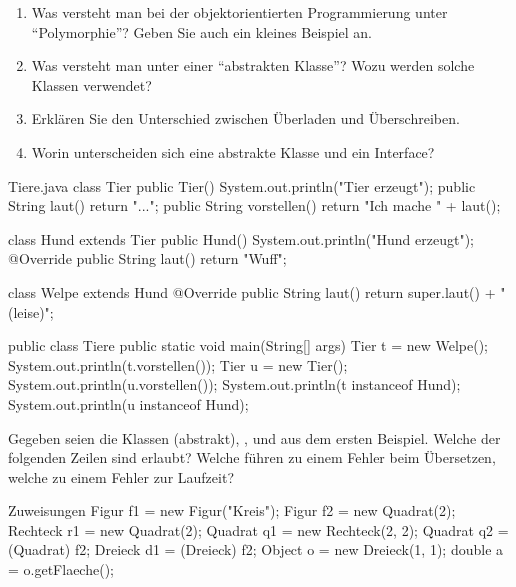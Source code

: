 \aufgaben
{}
\begin{enumerate}[label=\alph*)]
\item Was versteht man bei der objektorientierten Programmierung unter \enquote{Polymorphie}? Geben Sie auch ein kleines Beispiel an.
\item Was versteht man unter einer \enquote{abstrakten Klasse}? Wozu werden solche Klassen verwendet?
\item Erklären Sie den Unterschied zwischen Überladen und Überschreiben.
\item Worin unterscheiden sich eine abstrakte Klasse und ein Interface?
\end{enumerate}

\begin{javacode}{Tiere.java}
class Tier {
	public Tier() { System.out.println("Tier erzeugt"); }
	public String laut() { return "..."; }
	public String vorstellen() { return "Ich mache " + laut(); }
}

class Hund extends Tier {
	public Hund() { System.out.println("Hund erzeugt"); }
	@Override
	public String laut() { return "Wuff"; }
}

class Welpe extends Hund {
	@Override
	public String laut() { return super.laut() + " (leise)"; }
}

public class Tiere {
	public static void main(String[] args) {
		Tier t = new Welpe();
		System.out.println(t.vorstellen());
		Tier u = new Tier();
		System.out.println(u.vorstellen());
		System.out.println(t instanceof Hund);
		System.out.println(u instanceof Hund);
	}
}
\end{javacode}

Gegeben seien die Klassen  (abstrakt), ,  und  aus dem ersten Beispiel. Welche der folgenden Zeilen sind erlaubt? Welche führen zu einem Fehler beim Übersetzen, welche zu einem Fehler zur Laufzeit?
\begin{javacode}[Ausschnitt]{Zuweisungen}
Figur f1 = new Figur("Kreis");
Figur f2 = new Quadrat(2);
Rechteck r1 = new Quadrat(2);
Quadrat q1 = new Rechteck(2, 2);
Quadrat q2 = (Quadrat) f2;
Dreieck d1 = (Dreieck) f2;
Object o = new Dreieck(1, 1);
double a = o.getFlaeche();
\end{javacode}

